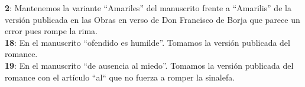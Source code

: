 \noindent \textbf{2}: Mantenemos la variante ``Amariles'' del manuscrito frente a ``Amarilis'' de la versión publicada en las Obras en verso de Don Francisco de Borja que parece un error pues rompe la rima.\\
\textbf{18}: En el manuscrito ``ofendido es humilde''. Tomamos la versión publicada del romance.\\
\textbf{19}: En el manuscrito ``de ausencia al miedo''. Tomamos la versión publicada del romance con el artículo ``al`` que no fuerza a romper la sinalefa.\\
